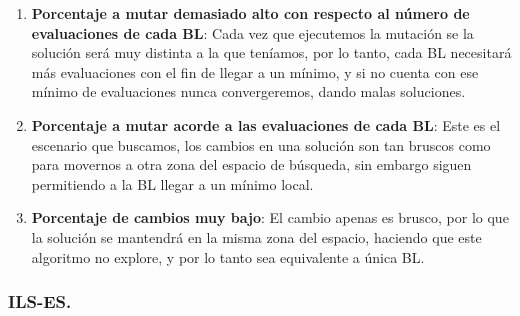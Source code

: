\documentclass[12pt, spanish]{article}
\begin{document}
\begin{enumerate}
	\item \textbf{Porcentaje a mutar demasiado alto con respecto al número de evaluaciones de cada BL}: Cada vez que ejecutemos la mutación se la solución será muy distinta a la que teníamos, por lo tanto, cada BL necesitará más evaluaciones con el fin de llegar a un mínimo, y si no cuenta con ese mínimo de evaluaciones nunca convergeremos, dando malas soluciones.
	\item \textbf{Porcentaje a mutar acorde a las evaluaciones de cada BL}: Este es el escenario que buscamos, los cambios en una solución son tan bruscos como para movernos a otra zona del espacio de búsqueda, sin embargo siguen permitiendo a la BL llegar a un mínimo local.
	\item \textbf{Porcentaje de cambios muy bajo}: El cambio apenas es brusco, por lo que la solución se mantendrá en la misma zona del espacio, haciendo que este algoritmo no explore, y por lo tanto sea equivalente a única BL.
\end{enumerate}

\subsubsection{ILS-ES.}
\end{document}
